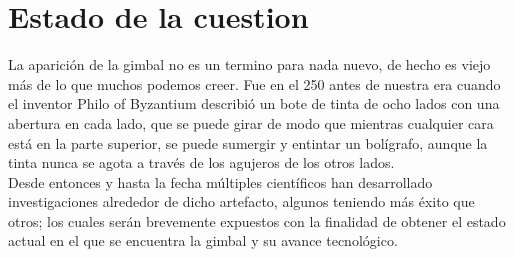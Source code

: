 \section{Estado de la cuestion}
La aparición de la gimbal no es un termino para nada nuevo, de hecho es viejo más de lo que
muchos podemos creer. Fue en el 250 antes de nuestra era cuando el inventor Philo of Byzantium
describió un bote de tinta de ocho lados con una abertura en cada lado, que se puede
girar de modo que mientras cualquier cara está en la parte superior, se puede sumergir y
entintar un bolígrafo, aunque la tinta nunca se agota a través de los agujeros de los otros
lados. \cite{WEB:Gimbal}\\
Desde entonces y hasta la fecha múltiples científicos han desarrollado investigaciones alrededor
de dicho artefacto, algunos teniendo más éxito que otros; los cuales serán brevemente expuestos
con la finalidad de obtener el estado actual en el que se encuentra la gimbal y su avance
tecnológico.
